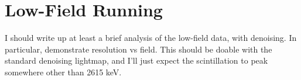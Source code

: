 \renewcommand{\thechapter}{5}
\chapter{Low-Field Running}

I should write up at least a brief analysis of the low-field data, with denoising.  In particular, demonstrate resolution vs field.  This should be doable with the standard denoising lightmap, and I'll just expect the scintillation to peak somewhere other than 2615 keV.

